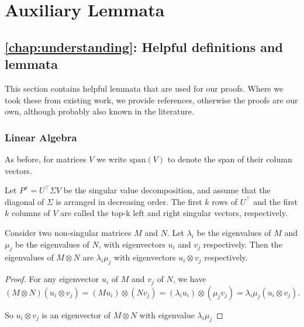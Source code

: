 \chapter{Auxiliary Lemmata}
\label{app:formal}

\section{\autoref{chap:understanding}: Helpful definitions and lemmata}

\label{app:formal:understanding}

This section contains helpful lemmata that are used for our proofs.
Where we took these from existing work, we provide references, otherwise the proofs are our own, although probably also known in the literature.

\subsection{Linear Algebra}
\label{app:formal:understanding:linalg}

As before, for matrices $V$ we write $\mathrm{span}(V)$ to denote the span of their column vectors. 

\begin{definition}\label{def:understanding:topk-single}
Let $P^\pi = U^\top \Sigma V$ be the singular value decomposition, and assume that the diagonal of $\Sigma$ is arranged in decreasing order.
The first $k$ rows of $U^\top$ and the first $k$ columns of $V$ are called the top-k left and right singular vectors, respectively.
\end{definition}

\begin{lemma}\label{lem:understanding:spectrum_kronecker}
    Consider two non-singular matrices $M$ and $N$. Let $\lambda_i$ be the eigenvalues of $M$ and $\mu_j$ be the eigenvalues of $N$, with eigenvectors $u_i$ and $v_j$ respectively. Then the eigenvalues of $M\otimes N$ are $\lambda_i\mu_j$ with eigenvectors $u_i \otimes v_j$ respectively.
\end{lemma}

\begin{proof}
For any eigenvector $u_i$ of $M$ and $v_j$ of $N$, we have
    $$\left(M\otimes N\right) \left(u_i \otimes v_j\right) = \left(M u_i\right) \otimes \left(N v_j\right) = \left(\lambda_i u_i\right)\otimes\left(\mu_j v_j\right) = \lambda_i\mu_j \left(u_i \otimes v_j\right).$$

    So $u_i\otimes v_j$ is an eigenvector of $M\otimes N$ with eigenvalue $\lambda_i \mu_j$
\end{proof}

